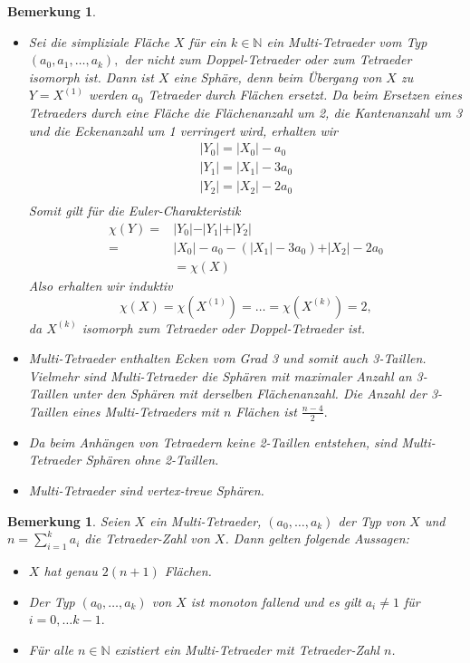 \documentclass[12pt,titlepage,twoside,cleardoublepage]{article}
\theoremstyle{nummermitklammern}
\newtheorem{bemerkung}[temp]{Bemerkung}
\newtheorem{bemerkung}[zahl]{Bemerkung}
\numberwithin{equation}{section}
\begin{document}
\begin{bemerkung}
\begin{itemize}
\item Sei die simpliziale Fläche $X$ für ein $k\in \mathbb{N}$ ein Multi-Tetraeder vom Typ $(a_0,a_1,\ldots,a_k),$ der nicht zum Doppel-Tetraeder oder zum Tetraeder isomorph ist. Dann ist $X$ eine Sphäre, denn beim Übergang von $X$ zu $Y=X^{(1)}$ werden $a_0$ Tetraeder durch Flächen ersetzt. Da beim Ersetzen eines Tetraeders durch eine Fläche die Flächenanzahl um 2, die Kantenanzahl um 3 und die Eckenanzahl um 1 verringert wird, erhalten wir  
\begin{align*}
\vert Y_0\vert =\vert X_0\vert-a_0\\
\vert Y_1\vert=\vert X_1\vert-3a_0\\
\vert Y_2\vert=\vert X_2\vert-2a_0\\
\end{align*}
Somit gilt für die Euler-Charakteristik
\begin{align*}
\chi(Y)=&\vert Y_0\vert -\vert Y_1\vert+\vert Y_2\vert\\
=&\vert X_0\vert-a_0-(\vert X_1\vert-3a_0)+\vert X_2\vert-2a_0\\
&=\chi (X)
\end{align*}
Also erhalten wir induktiv 
\[
\chi(X)=\chi(X^{(1)})=\ldots=\chi(X^{(k)})=2,
\]
da $X^{(k)}$ isomorph zum Tetraeder oder Doppel-Tetraeder ist.
\item Multi-Tetraeder enthalten Ecken vom Grad 3 und somit auch 3-Taillen. Vielmehr sind Multi-Tetraeder die Sphären mit maximaler Anzahl an 3-Taillen unter den Sphären mit derselben Flächenanzahl. Die Anzahl der 3-Taillen eines Multi-Tetraeders mit $n$ Flächen ist $\frac{n-4}{2}.$

\item
Da beim Anhängen von Tetraedern keine 2-Taillen entstehen, sind Multi-Tetraeder Sphären ohne 2-Taillen.
\item
Multi-Tetraeder sind vertex-treue Sphären.
\end{itemize}
\end{bemerkung}
\begin{bemerkung}
Seien $X$ ein Multi-Tetraeder, $(a_0,\ldots,a_k)$ der Typ von $X$ und $n=\sum_{i=1}^{k}a_i$ die Tetraeder-Zahl von $X$. Dann gelten folgende Aussagen: 
\begin{itemize}
\item $X$ hat genau $2(n+1)$ Flächen. 
\item Der Typ $(a_0,\ldots,a_k)$ von $X$ ist monoton fallend und es gilt $a_i\neq 1$ für $i=0,\ldots k-1.$
\item  Für alle $n \in \mathbb{N}$ existiert ein Multi-Tetraeder mit Tetraeder-Zahl $n$.
\end{itemize}
\end{bemerkung}
\end{document}
